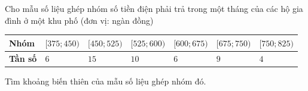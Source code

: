 \begin{ex}%
Cho mẫu số liệu ghép nhóm số tiền điện phải trả trong một tháng của các hộ gia đình ở một khu phố (đơn vị: ngàn đồng)
\begin{center}
\begin{tabular}{|>{\centering\arraybackslash}m{2cm}|>{\centering\arraybackslash}m{2cm}|>{\centering\arraybackslash}m{2cm}|>{\centering\arraybackslash}m{2cm}|>{\centering\arraybackslash}m{2cm}|>{\centering\arraybackslash}m{2cm}|>{\centering\arraybackslash}m{2cm}|}
\hline
\textbf{Nhóm} & $[375;450)$ & $[450;525)$ & $[525;600)$ & $[600;675)$& $[675;750)$& $[750;825)$\\
\hline
\textbf{Tần số} & $6$ & $15$ & $10$ & $6$ & $9$ & $4$\\
\hline
\end{tabular}
\end{center}
Tìm khoảng biến thiên của mẫu số liệu ghép nhóm đó.
\end{ex}

